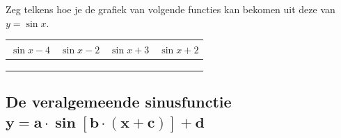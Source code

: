 \documentclass[a4paper,12pt,twoside ]{article}
\begin{document}
\begin{oefening}
Zeg telkens hoe je de grafiek van volgende functies kan bekomen uit deze van $y=\sin x$.
\begin{center}
  \begin{tabular}{c|c|c|c}
    $\sin x-4$ & $\sin x-2$ & $\sin x+3$ & $\sin x+2$\\
    \hline
    \hspace*{3cm} &\hspace*{3cm}&\hspace*{3cm}&\hspace*{3cm}
    \\
    &&&
    \\
    &&&
  \end{tabular}
\end{center}
\end{oefening}

\subsection{De veralgemeende sinusfunctie $\boldsymbol{y=a\cdot \sin[b\cdot (x+c)]+d}$}
\end{document}
